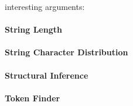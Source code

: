             



            interesting arguments:
                 
        \paragraph{String Length}
        \paragraph{String Character Distribution}
        \paragraph{Structural Inference}
        \paragraph{Token Finder}


